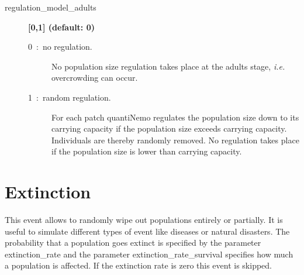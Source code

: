 \documentclass[letterpaper,12pt,oneside]{book}
\begin{document}
\begin{description}
\item[regulation\_model\_adults] \textbf{[0,1] (default: 0)}
\begin{description}
\item[0~:~no regulation.] No population size regulation takes place at the adults stage, \textit{i.e.} overcrowding can occur.
\item[1~:~random regulation.] For each patch quantiNemo regulates the population size down to its carrying capacity if the population size exceeds carrying capacity. Individuals are thereby randomly removed. No regulation takes place if the population size is lower than carrying capacity.
\end{description}
\end{description}

\section{Extinction}\label{sec:Extinction}
This event allows to randomly wipe out populations entirely or partially. It is useful to simulate different types of event like diseases or natural disasters.   The probability that a population goes extinct is specified by the parameter \textsf{extinction\_rate} and the parameter \textsf{extinction\_rate\_survival} specifies how much a population is affected. If the extinction rate is zero this event is skipped.
\end{document}
